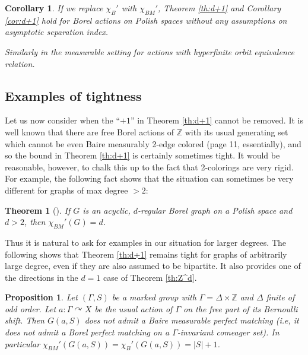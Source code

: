 \documentclass[10pt,a4paper]{article}
\newcommand{\0}{\varnothing}
\newcommand{\Z}{\mathbb{Z}}
\newtheorem{theorem}{Theorem}
\newtheorem{corollary}{Corollary}
\newtheorem{prop}{Proposition}
\begin{document}
\begin{corollary}
If we replace $\chi_B'$ with $\chi_{BM}'$, Theorem \ref{th:d+1} and Corollary \ref{cor:d+1} hold for Borel actions on Polish spaces without any assumptions on asymptotic separation index. 

Similarly in the measurable setting for actions with hyperfinite orbit equivalence relation. 
\end{corollary}

\subsection{Examples of tightness}

Let us now consider when the ``$+1$'' in Theorem \ref{th:d+1} cannot be removed. It is well known that there are free Borel actions of $\Z$ with its usual generating set which cannot be even Baire measurably 2-edge colored \cite{KST} (page 11, essentially), and so the bound in Theorem \ref{th:d+1} is certainly sometimes tight. It would be reasonable, however, to chalk this up to the fact that 2-colorings are very rigid. For example, the following fact shows that the situation can sometimes be very different for graphs of max degree $>2$:

\begin{theorem}[\cite{KM}]
If $G$ is an acyclic, $d$-regular Borel graph on a Polish space and $d > 2$, then $\chi_{BM}'(G) = d$.
\end{theorem}

Thus it is natural to ask for examples in our situation for larger degrees. The following shows that Theorem \ref{th:d+1} remains tight for graphs of arbitrarily large degree, even if they are also assumed to be bipartite. It also provides one of the directions in the $d=1$ case of Theorem \ref{th:Z^d}.

\begin{prop}\label{prop:Zexample}
Let $(\Gamma,S)$ be a marked group with $\Gamma = \Delta \times \Z$ and $\Delta$ finite of odd order. Let $a:\Gamma \curvearrowright X$ be the usual action of $\Gamma$ on the free part of its Bernoulli shift. Then $G(a,S)$ does not admit a Baire measurable perfect matching (i.e, it does not admit a Borel perfect matching on a $\Gamma$-invariant comeager set). In particular $\chi_{BM}'(G(a,S)) = \chi_B'(G(a,S)) = |S|+1$.
\end{prop}
\end{document}
